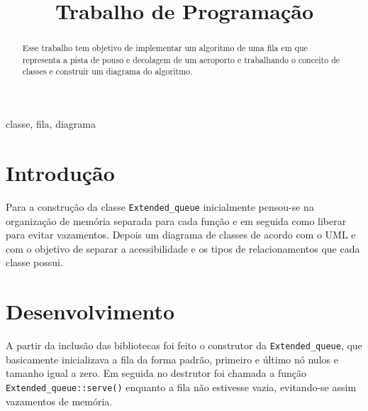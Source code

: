 \documentclass[conference]{IEEEtran}
\begin{document}
\title{Trabalho de Programação}
\author{

}
\maketitle
\begin{abstract}

Esse trabalho tem objetivo de implementar um algoritmo de uma fila em que representa a pista de pouso e decolagem de um aeroporto e trabalhando o conceito de classes e construir um diagrama do algoritmo.


\end{abstract}

\begin{IEEEkeywords}
classe, fila, diagrama
\end{IEEEkeywords}
\section{Introdução}
Para a construção da classe \texttt{Extended\_queue} inicialmente pensou-se na organização de memória separada para cada função e em seguida como liberar para evitar vazamentos. Depois um diagrama de classes de acordo com o UML e com o objetivo de separar a acessibilidade e os tipos de relacionamentos que cada classe possui.
 
\section{Desenvolvimento}

A partir da inclusão das bibliotecas foi feito o construtor da \texttt{Extended\_queue}, que basicamente inicializava a fila da forma padrão, primeiro e último nó nulos e tamanho igual a zero. Em seguida no destrutor foi chamada a função \texttt{Extended\_queue::serve()} enquanto a fila não estivesse vazia, evitando-se assim vazamentos de memória.
\end{document}
